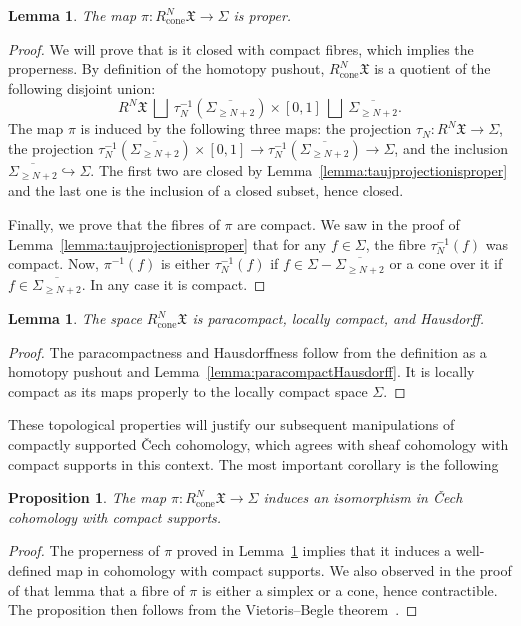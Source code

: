 \documentclass[a4paper]{amsart}
\newcommand{\fX}{\mathfrak X}
\newcommand{\lra}{\longrightarrow}
\theoremstyle{plain}
\newtheorem{proposition}[theorem]{Proposition}
\newtheorem{lemma}[theorem]{Lemma}
\theoremstyle{definition}
\begin{document}
\begin{lemma}\label{lemma:piisproper}
The map $\pi \colon R^N_{\text{cone}}\fX \lra \Sigma$ is proper.
\end{lemma}
\begin{proof}
We will prove that is it closed with compact fibres, which implies the properness. By definition of the homotopy pushout, $R^N_{\text{cone}}\fX$ is a quotient of the following disjoint union:
\[
    R^N\fX \ \bigsqcup \ \tau_N^{-1}\left(\overline{\Sigma_{\geq N+2}}\right) \times [0,1] \ \bigsqcup \ \overline{\Sigma_{\geq N+2}}.
\]
The map $\pi$ is induced by the following three maps: the projection $\tau_N \colon R^N\fX \to \Sigma$, the projection $\tau_N^{-1}\left(\overline{\Sigma_{\geq N+2}}\right) \times [0,1] \to \tau_N^{-1}\left(\overline{\Sigma_{\geq N+2}}\right) \to \Sigma$, and the inclusion $\overline{\Sigma_{\geq N+2}} \hookrightarrow \Sigma$. The first two are closed by Lemma~\ref{lemma:taujprojectionisproper} and the last one is the inclusion of a closed subset, hence closed.

Finally, we prove that the fibres of $\pi$ are compact. We saw in the proof of Lemma~\ref{lemma:taujprojectionisproper} that for any $f \in \Sigma$, the fibre $\tau_N^{-1}(f)$ was compact. Now, $\pi^{-1}(f)$ is either $\tau_N^{-1}(f)$ if $f \in \Sigma - \overline{\Sigma_{\geq N+2}}$ or a cone over it if $f \in \overline{\Sigma_{\geq N+2}}$. In any case it is compact.
\end{proof}

\begin{lemma}
The space $R^N_{\text{cone}}\fX$ is paracompact, locally compact, and Hausdorff.
\end{lemma}
\begin{proof}
The paracompactness and Hausdorffness follow from the definition as a homotopy pushout and Lemma~\ref{lemma:paracompactHausdorff}. It is locally compact as its maps properly to the locally compact space $\Sigma$.
\end{proof}

These topological properties will justify our subsequent manipulations of compactly supported \v{C}ech cohomology, which agrees with sheaf cohomology with compact supports in this context. The most important corollary is the following
\begin{proposition}\label{prop:piinducesiso}
The map $\pi \colon R^N_{\text{cone}}\fX \lra \Sigma$ induces an isomorphism in \v{C}ech cohomology with compact supports.
\end{proposition}
\begin{proof}
The properness of $\pi$ proved in Lemma~\ref{lemma:piisproper} implies that it induces a well-defined map in cohomology with compact supports. We also observed in the proof of that lemma that a fibre of $\pi$ is either a simplex or a cone, hence contractible. The proposition then follows from the Vietoris--Begle theorem~\cite[V.6.1]{bredon_sheaf_1997}.
\end{proof}
\end{document}
